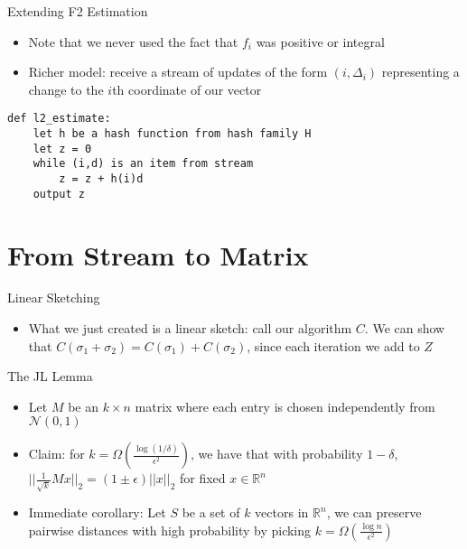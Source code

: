\documentclass[aspectratio=169]{beamer}
\begin{document}
\begin{frame}[fragile]{Extending F2 Estimation}
\protect\hypertarget{extending-f2-estimation}{}
\begin{itemize}
\tightlist
\item
  Note that we never used the fact that \(f_i\) was positive or integral
\item
  Richer model: receive a stream of updates of the form
  \((i, \Delta_i)\) representing a change to the \(i\)th coordinate of
  our vector \pause
\end{itemize}

\begin{verbatim}
def l2_estimate:
    let h be a hash function from hash family H
    let z = 0
    while (i,d) is an item from stream
        z = z + h(i)d
    output z
\end{verbatim}
\end{frame}

\section{From Stream to Matrix}

\frame{\sectionpage}

\begin{frame}{Linear Sketching}
\protect\hypertarget{linear-sketching}{}
\begin{itemize}
\tightlist
\item
  What we just created is a linear sketch: call our algorithm \(C\). We
  can show that \(C(\sigma_1 + \sigma_2) = C(\sigma_1) + C(\sigma_2)\),
  since each iteration we add to \(Z\)
\end{itemize}
\end{frame}

\begin{frame}{The JL Lemma}
\protect\hypertarget{the-jl-lemma}{}
\begin{itemize}
\tightlist
\item
  Let \(M\) be an \(k \times n\) matrix where each entry is chosen
  independently from \(\mathcal{N}(0,1)\)
\item
  Claim: for
  \(k = \Omega\left(\frac{\log(1/\delta)}{\epsilon^2}\right)\), we have
  that with probability \(1 - \delta\),
  \(||\frac{1}{\sqrt{k}}Mx||_2 = (1 \pm \epsilon)||x||_2\) for fixed
  \(x \in \mathbb{R}^n\) \pause
\item
  Immediate corollary: Let \(S\) be a set of \(k\) vectors in
  \(\mathbb{R}^n\), we can preserve pairwise distances with high
  probability by picking
  \(k = \Omega\left(\frac{\log n}{\epsilon^2}\right)\) \pause
\end{itemize}
\end{frame}
\end{document}
